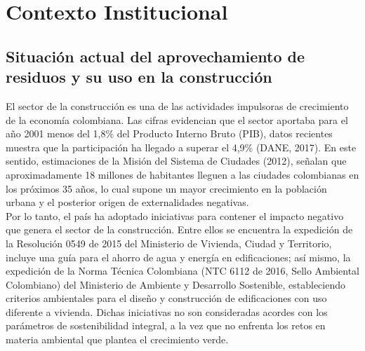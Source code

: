 \documentclass[12pt]{article}
\begin{document}

\section{Contexto Institucional}
\subsection{Situación actual del aprovechamiento de residuos y su uso en la construcción}
El sector de la construcción es una de las actividades impulsoras de crecimiento de la economía colombiana. Las cifras evidencian que el sector aportaba para el año 2001 menos del 1,8\% del Producto Interno Bruto (PIB), datos recientes muestra que la participación ha llegado a superar el 4,9\% (DANE, 2017). En este sentido, estimaciones de la Misión del Sistema de Ciudades (2012), señalan que aproximadamente 18 millones de habitantes lleguen a las ciudades colombianas en los próximos 35 años, lo cual supone un mayor crecimiento en la población urbana y el posterior origen de externalidades negativas.\\

Por lo tanto, el país ha adoptado iniciativas para contener el impacto negativo que genera el sector de la construcción.  Entre ellos se encuentra la expedición de la Resolución 0549 de 2015 del Ministerio de Vivienda, Ciudad y Territorio, incluye una guía para el ahorro de agua y energía en edificaciones; así mismo, la expedición de la Norma Técnica Colombiana (NTC 6112 de 2016, Sello Ambiental Colombiano) del Ministerio de Ambiente y Desarrollo Sostenible, estableciendo  criterios ambientales para el diseño y construcción de edificaciones con uso diferente a vivienda. Dichas iniciativas no son consideradas acordes con los parámetros de sostenibilidad integral, a la vez que no enfrenta los retos en materia ambiental que plantea el crecimiento verde.\\
\end{document}
